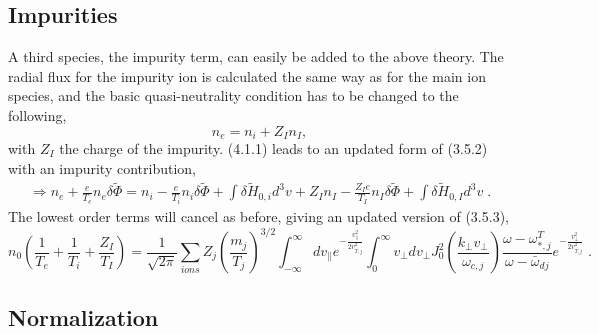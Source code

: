 \documentclass[12pt]{article}
\numberwithin{equation}{subsection}
\begin{document}
\subsection{Impurities}
   \quad A third species, the impurity term, can easily be added to the above theory. The radial flux for the impurity ion is calculated the same way as for
the main ion species, and the basic quasi-neutrality condition has to be changed to the following,
   \begin{equation}
      n_e = n_i + Z_In_I,
   \end{equation}
with $Z_I$ the charge of the impurity. (4.1.1) leads to an updated form of (3.5.2) with an impurity contribution,
   \begin{equation}
   \begin{aligned}
      \Rightarrow n_e + \frac{e}{T_e}n_e\delta\widetilde{\Phi} = n_i - \frac{e}{T_i}n_i\delta\widetilde{\Phi} + \int\delta\widetilde{H}_{0,i}d^3v
                      + Z_In_I - \frac{Z_Ie}{T_I}n_I\delta\widetilde{\Phi} + \int\delta\widetilde{H}_{0,I}d^3v\;.
   \end{aligned}
   \end{equation}
The lowest order terms will cancel as before, giving an updated version of (3.5.3),
   \begin{equation}
      n_0(\frac{1}{T_e} + \frac{1}{T_i} + \frac{Z_I}{T_I}) = \frac{1}{\sqrt{2\pi}}\sum\limits_{ions}Z_j\left(\frac{m_j}{T_j}\right)^{3/2}
         \int_{-\infty}^{\infty}dv_\parallel e^{-\frac{v_\parallel^2}{2v^2_{T,j}}}
         \int_{0}^{\infty}v_\perp dv_\perp J_0^2(\frac{k_\perp v_\perp}{\omega_{c,j}})
         \frac{\omega - \omega_{*,j}^T}{\omega - \bar{\omega}_{dj}}e^{-\frac{v_\perp^2}{2v_{T,j}^2}}\;.
   \end{equation} 

\subsection{Normalization}
\end{document}
